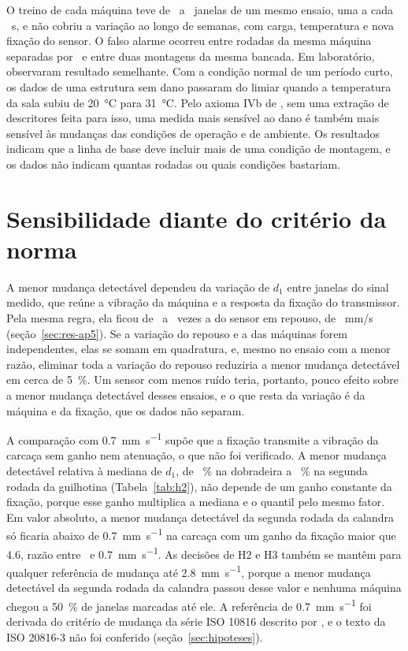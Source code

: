 O treino de cada máquina teve de \campoJanelasGuilhotinaUm\ a \campoJanelasCalandraUm\ janelas de um mesmo ensaio, uma a cada \campoCicloUm~s, e não cobriu a variação ao longo de semanas, com carga, temperatura e nova fixação do sensor. O falso alarme ocorreu entre rodadas da mesma máquina separadas por \campoIntervaloCalandra\ e entre duas montagens da mesma bancada. Em laboratório,  observaram resultado semelhante. Com a condição normal de um período curto, os dados de uma estrutura sem dano passaram do limiar quando a temperatura da sala subiu de \SI{20}{\celsius} para \SI{31}{\celsius}. Pelo axioma IVb de , sem uma extração de descritores feita para isso, uma medida mais sensível ao dano é também mais sensível às mudanças das condições de operação e de ambiente. Os resultados indicam que a linha de base deve incluir mais de uma condição de montagem, e os dados não indicam quantas rodadas ou quais condições bastariam.

\section{Sensibilidade diante do critério da norma}\label{sec:disc-sensibilidade}

A menor mudança detectável dependeu da variação de $d_1$ entre janelas do sinal medido, que reúne a vibração da máquina e a resposta da fixação do transmissor. Pela mesma regra, ela ficou de \apCincoRazaoMin\ a \apCincoRazaoMax\ vezes a do sensor em repouso, de \apCincoMmd~mm/s (seção~\ref{sec:res-ap5}). Se a variação do repouso e a das máquinas forem independentes, elas se somam em quadratura, e, mesmo no ensaio com a menor razão, eliminar toda a variação do repouso reduziria a menor mudança detectável em cerca de \SI{5}{\percent}. Um sensor com menos ruído teria, portanto, pouco efeito sobre a menor mudança detectável desses ensaios, e o que resta da variação é da máquina e da fixação, que os dados não separam.

A comparação com \SI{0,7}{\milli\meter\per\second} supõe que a fixação transmite a vibração da carcaça sem ganho nem atenuação, o que não foi verificado. A menor mudança detectável relativa à mediana de $d_1$, de \hDoisRelDobradeiraUm~\% na dobradeira a \hDoisRelGuilhotinaDois~\% na segunda rodada da guilhotina (Tabela~\ref{tab:h2}), não depende de um ganho constante da fixação, porque esse ganho multiplica a mediana e o quantil pelo mesmo fator. Em valor absoluto, a menor mudança detectável da segunda rodada da calandra só ficaria abaixo de \SI{0,7}{\milli\meter\per\second} na carcaça com um ganho da fixação maior que \num{4,6}, razão entre \hDoisMmdCalandraDois\ e \SI{0,7}{\milli\meter\per\second}. As decisões de H2 e H3 também se mantêm para qualquer referência de mudança até \SI{2,8}{\milli\meter\per\second}, porque a menor mudança detectável da segunda rodada da calandra passou desse valor e nenhuma máquina chegou a \SI{50}{\percent} de janelas marcadas até ele. A referência de \SI{0,7}{\milli\meter\per\second} foi derivada do critério de mudança da série ISO 10816 descrito por , e o texto da ISO 20816-3 não foi conferido (seção~\ref{sec:hipoteses}).

